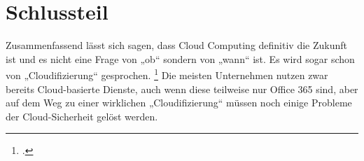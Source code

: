 \chapter{Schlussteil} %
\label{cha:Schlussteil}

Zusammenfassend lässt sich sagen, dass Cloud Computing definitiv die Zukunft ist und es nicht eine Frage von „ob“ sondern von „wann“ ist. Es wird sogar schon von „Cloudifizierung“ gesprochen. \footcite[Vgl.][S. 9]{Pohlmann.2022} Die meisten Unternehmen nutzen zwar bereits Cloud-basierte Dienste, auch wenn diese teilweise nur Office 365 sind, aber auf dem Weg zu einer wirklichen „Cloudifizierung“ müssen noch einige Probleme der Cloud-Sicherheit gelöst werden. \\


